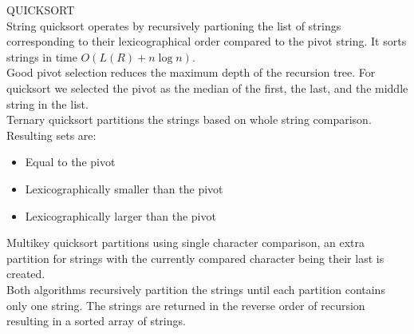 {\sffamily\normalsize{\color{sciorange} QUICKSORT}}\vspace{1mm}\\
\footnotesize 
String quicksort operates by recursively partioning the list of strings corresponding to their lexicographical order compared to the pivot string. It sorts strings in time $O(L(R) + n \log n)$.\\ 

Good pivot selection reduces the maximum depth of the recursion tree. For quicksort we selected the pivot as the median of the first, the last, and the middle string in the list.\\

Ternary quicksort partitions the strings based on whole string comparison. Resulting sets are:
    
\begin{itemize}
    \item Equal to the pivot
    \item Lexicographically smaller than the pivot
    \item Lexicographically larger than the pivot
\end{itemize}

Multikey quicksort partitions using single character comparison, an extra partition for strings with the currently compared character being their last is created.\\

Both algorithms recursively partition the strings until each partition contains only one string. The strings are returned in the reverse order of recursion resulting in a sorted array of strings. 




